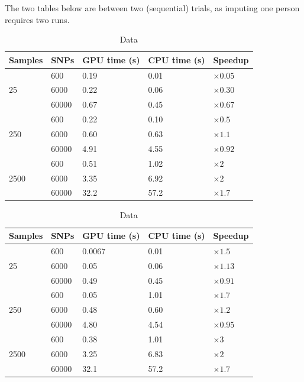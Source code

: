 \documentclass[12pt]{article}
\begin{document}
The two tables below are between two (sequential) trials, as imputing one
person requires two runs.



\begin{table}[ht]
  \caption{Data}
\begin{tabular}{l|lll|l}
Samples & SNPs  & GPU time (s) & CPU time (s) & Speedup       \\
        \hline
        & 600   & 0.19         & 0.01         & $\times 0.05$ \\
25      & 6000  & 0.22         & 0.06         & $\times 0.30$ \\
        & 60000 & 0.67         & 0.45         & $\times 0.67$ \\
        \hline
        & 600   & 0.22         & 0.10         & $\times 0.5$  \\
250     & 6000  & 0.60         & 0.63         & $\times 1.1$  \\
        & 60000 & 4.91         & 4.55         & $\times 0.92$ \\
        \hline
        & 600   & 0.51         & 1.02         & $\times 2$    \\
2500    & 6000  & 3.35         & 6.92         & $\times 2$    \\
        & 60000 & 32.2         & 57.2         & $\times 1.7$
\end{tabular}

\begin{tabular}{l|lll|l}
  Samples & SNPs & GPU time (s) & CPU time (s) & Speedup       \\
\hline
  & 600&0.0067       & 0.01         & $\times 1.5$  \\
  25 & 6000 &0.05         & 0.06         & $\times 1.13$ \\
  & 60000&0.49         & 0.45         & $\times 0.91$ \\
\hline
  & 600&0.05         & 1.01         & $\times 1.7$  \\
  250 & 6000&0.48         & 0.60         & $\times 1.2$  \\
  & 60000 &4.80         & 4.54         & $\times 0.95$ \\
\hline
  & 600&0.38         & 1.01         & $\times 3$    \\
  2500 &6000 &3.25         & 6.83         & $\times 2$    \\
  & 60000&32.1         & 57.2         & $\times 1.7$
\end{tabular}
\end{table}
\end{document}
